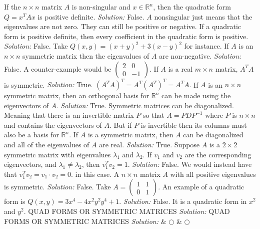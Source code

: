 \fi     
\ifnum {}
    If the $n\times n$ matrix $A$ is non-singular and $x\in \mathbb R^n$, then the quadratic form $Q = x^TAx $  is positive definite. 
    \ifnum {} {\color{DarkBlue} \textit{Solution:  }  False. 
    $A$ nonsingular just means that the eigenvalues are not zero. They can still be positive or negative.}  \fi
\fi     
\ifnum {}
       If a quadratic form is positive definite, then every coefficient in the quadratic form is positive. 
    \ifnum {} {\color{DarkBlue} \textit{Solution:  }
    False. Take $Q(x,y) = (x+y)^2 + 3 (x-y)^2$ for instance. } \fi
\fi        
\ifnum {}
    If $A$ is an $n\times n$ symmetric matrix then the eigenvalues of $A$ are non-negative. 
    \ifnum {} {\color{DarkBlue} \textit{Solution:  } False. A counter-example would be $\begin{pmatrix} 2&0\\0&-1\end{pmatrix}$.   } \fi
\fi
\ifnum {}
    If $A$ is a real $m\times n$ matrix, $A^TA$ is symmetric. 
    \ifnum {} {\color{DarkBlue} \textit{Solution:  } True. 
    $(A^TA)^T = A^T (A^T)^T = A^TA$.} \fi
\fi  
\ifnum {}
    If $A$ is an $n\times n$ symmetric matrix, then an orthogonal basis for $\mathbb R^n$ can be made using the eigenvectors of $A$. 
    \ifnum {} {\color{DarkBlue} \textit{Solution:  } True. Symmetric matrices can be diagonalized. Meaning that there is an invertible matrix $P$ so that $A=PDP^{-1}$ where $P$ is $n\times n$ and contains the eigenvectors of $A$. But if $P$ is invertible then its columns must also be a basis for $\mathbb R^n$.} \fi
\fi   
\ifnum {} %
    If $A$ is a symmetric matrix, then $A$ can be diagonalized and all of the eigenvalues of $A$ are real. 
    \ifnum {} {\color{DarkBlue} \textit{Solution:  } True. } \fi
\fi   
\ifnum {} %
    Suppose $A$ is a $2\times 2$ symmetric matrix with eigenvalues $\lambda_1$ and $\lambda_2$. If $v_1$ and $v_2$ are the corresponding eigenvectors, and $\lambda_1 \ne \lambda_2$, then $v_1^T v_2 = 1$. 
    \ifnum {} {\color{DarkBlue} \textit{Solution:  } False. We would instead have that $v_1^T v_2 = v_1 \cdot v_2 = 0$. in this case.  } \fi
\fi 
\ifnum {} %
     A $n\times n$ matrix $A$ with all positive eigenvalues is symmetric. 
    \ifnum {} {\color{DarkBlue} \textit{Solution:  } False. 
    Take $A = \begin{pmatrix} 1&1 \\ 0 & 1 \end{pmatrix}$.} \fi
\fi   
\ifnum {}
    An example of a quadratic form is $Q(x,y) = 3x^4 - 4 x^2y^2  y^4+1$.
    \ifnum {} {\color{DarkBlue} \textit{Solution:  } False. It is a quadratic form in $x^2$ and $y^2$.  } \fi
\fi   
\ifnum {} %
    QUAD FORMS OR SYMMETRIC MATRICES
    \ifnum {} {\color{DarkBlue} \textit{Solution:  }  } \fi
\fi   
\ifnum {} %
    QUAD FORMS OR SYMMETRIC MATRICES
    \ifnum {} {\color{DarkBlue} \textit{Solution:  }  } \fi
\fi 
& $\bigcirc$  & $\bigcirc$ \\[4pt]     \hline
